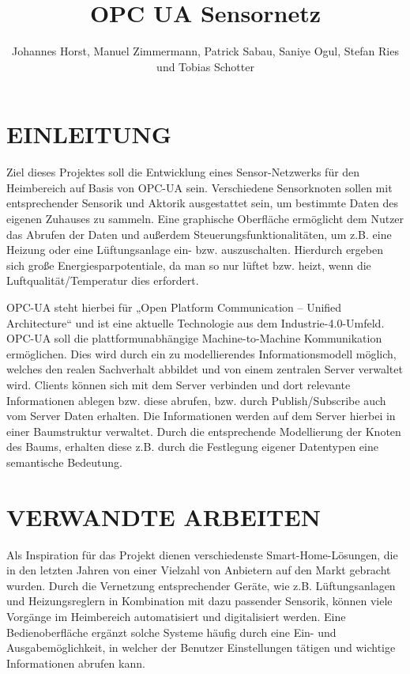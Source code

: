 \documentclass[letterpaper, 10 pt, conference]{ieeeconf}  %
\title{\LARGE \bf
OPC UA Sensornetz
}
\author{Johannes Horst, Manuel Zimmermann, Patrick Sabau, Saniye Ogul, Stefan Ries und Tobias Schotter}%
\begin{document}
\maketitle
\thispagestyle{empty}
\pagestyle{empty}

\section{EINLEITUNG}

Ziel dieses Projektes soll die Entwicklung eines Sensor-Netzwerks für den Heimbereich auf Basis von OPC-UA sein. 
Verschiedene Sensorknoten sollen mit entsprechender Sensorik und Aktorik ausgestattet sein, um bestimmte Daten des eigenen Zuhauses zu sammeln. 
Eine graphische Oberfläche ermöglicht dem Nutzer das Abrufen der Daten und außerdem Steuerungsfunktionalitäten, um z.B. eine Heizung oder eine Lüftungsanlage ein- bzw. auszuschalten. 
Hierdurch ergeben sich große Energiesparpotentiale, da man so nur lüftet bzw. heizt, wenn die Luftqualität/Temperatur dies erfordert.  

OPC-UA steht hierbei für „Open Platform Communication – Unified Architecture“ und ist eine aktuelle Technologie aus dem Industrie-4.0-Umfeld. OPC-UA soll die plattformunabhängige Machine-to-Machine Kommunikation ermöglichen. 
Dies wird durch ein zu modellierendes Informationsmodell möglich, welches den realen Sachverhalt abbildet und von einem zentralen Server verwaltet wird. 
Clients können sich mit dem Server verbinden und dort relevante Informationen ablegen bzw. diese abrufen, bzw. durch Publish/Subscribe auch vom Server Daten erhalten. Die Informationen werden auf dem Server hierbei in einer Baumstruktur verwaltet. 
Durch die entsprechende Modellierung der Knoten des Baums, erhalten diese z.B. durch die Festlegung eigener Datentypen eine semantische Bedeutung.



\section{VERWANDTE ARBEITEN}

Als Inspiration für das Projekt dienen verschiedenste Smart-Home-Lösungen, die in den letzten Jahren von einer Vielzahl von Anbietern auf den Markt gebracht wurden. 
Durch die Vernetzung entsprechender Geräte, wie z.B. Lüftungsanlagen und Heizungsreglern in Kombination mit dazu passender Sensorik, können viele Vorgänge im Heimbereich automatisiert und digitalisiert werden. 
Eine Bedienoberfläche ergänzt solche Systeme häufig durch eine Ein- und Ausgabemöglichkeit, in welcher der Benutzer Einstellungen tätigen und wichtige Informationen abrufen kann.
\end{document}
